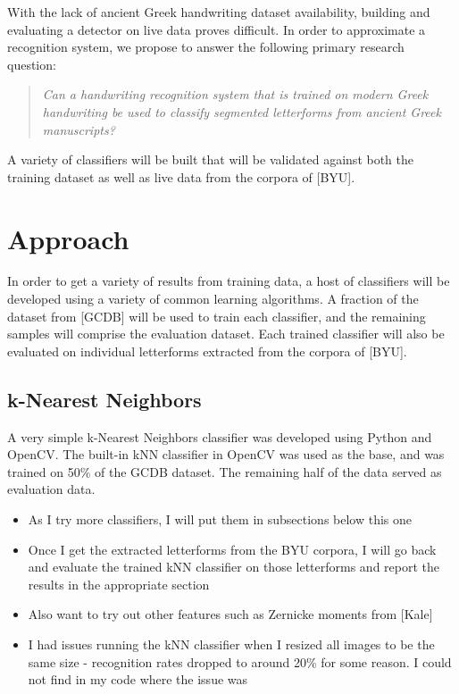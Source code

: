 \documentclass[10pt,twocolumn,letterpaper]{article}
\begin{document}
With the lack of ancient Greek handwriting dataset availability, building and evaluating a detector on live data proves difficult. In order to approximate a recognition system, we propose to answer the following primary research question:

\begin{quote}
    \textit{Can a handwriting recognition system that is trained on modern Greek handwriting be used to classify segmented letterforms from ancient Greek manuscripts?}
\end{quote}

A variety of classifiers will be built that will be validated against both the training dataset as well as live data from the corpora of [BYU].

\section{Approach}

In order to get a variety of results from training data, a host of classifiers will be developed using a variety of common learning algorithms. A fraction of the dataset from [GCDB] will be used to train each classifier, and the remaining samples will comprise the evaluation dataset. Each trained classifier will also be evaluated on individual letterforms extracted from the corpora of [BYU].

\subsection{k-Nearest Neighbors}

A very simple k-Nearest Neighbors classifier was developed using Python and OpenCV. The built-in kNN classifier in OpenCV was used as the base, and was trained on 50\% of the GCDB dataset. The remaining half of the data served as evaluation data.
\begin{itemize}
    \item As I try more classifiers, I will put them in subsections below this one
    \item Once I get the extracted letterforms from the BYU corpora, I will go back and evaluate the trained kNN classifier on those letterforms and report the results in the appropriate section
    \item Also want to try out other features such as Zernicke moments from [Kale]
    \item I had issues running the kNN classifier when I resized all images to be the same size - recognition rates dropped to around 20\% for some reason. I could not find in my code where the issue was
\end{itemize}
\end{document}
